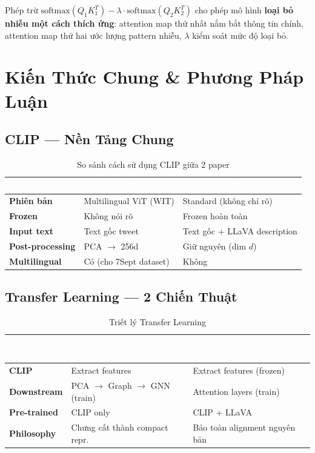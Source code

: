 \documentclass[12pt,a4paper]{article}
\begin{document}
\begin{insightbox}
Phép trừ $\text{softmax}(Q_1 K_1^T) - \lambda \cdot \text{softmax}(Q_2 K_2^T)$ cho phép mô hình \textbf{loại bỏ nhiễu một cách thích ứng}: attention map thứ nhất nắm bắt thông tin chính, attention map thứ hai ước lượng pattern nhiễu, $\lambda$ kiểm soát mức độ loại bỏ.
\end{insightbox}

\section{Kiến Thức Chung \& Phương Pháp Luận}

\subsection{CLIP — Nền Tảng Chung}

\begin{table}[H]
\centering
\caption{So sánh cách sử dụng CLIP giữa 2 paper}
\label{tab:clip}
\begin{tabularx}{\textwidth}{>{\bfseries}l X X}
\toprule
\rowcolor{tableheader}
\textcolor{white}{\textbf{Khía cạnh}} & \textcolor{white}{\textbf{Paper 1 (GNN)}} & \textcolor{white}{\textbf{Paper 2 (DiffAttn)}} \\
\midrule
Phiên bản & Multilingual ViT (WIT) & Standard (không chỉ rõ) \\
Frozen & Không nói rõ & Frozen hoàn toàn \\
Input text & Text gốc tweet & Text gốc + LLaVA description \\
Post-processing & PCA $\rightarrow$ 256d & Giữ nguyên (dim $d$) \\
Multilingual & Có (cho 7Sept dataset) & Không \\
\bottomrule
\end{tabularx}
\end{table}

\subsection{Transfer Learning — 2 Chiến Thuật}

\begin{table}[H]
\centering
\caption{Triết lý Transfer Learning}
\begin{tabularx}{\textwidth}{>{\bfseries}l X X}
\toprule
\rowcolor{tableheader}
\textcolor{white}{\textbf{Mặt}} & \textcolor{white}{\textbf{Paper 1: Transfer + Adapt}} & \textcolor{white}{\textbf{Paper 2: Transfer + Preserve}} \\
\midrule
CLIP & Extract features & Extract features (frozen) \\
Downstream & PCA $\rightarrow$ Graph $\rightarrow$ GNN (train) & Attention layers (train) \\
Pre-trained & CLIP only & CLIP + LLaVA \\
Philosophy & Chưng cất thành compact repr. & Bảo toàn alignment nguyên bản \\
\bottomrule
\end{tabularx}
\end{table}
\end{document}
